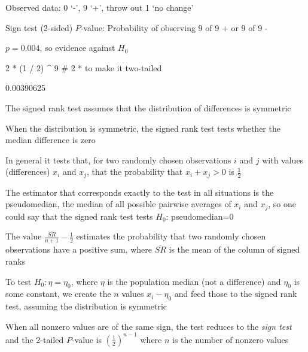  \item Observed data: 0 `-', 9 `+', throw out 1 `no change' 
 \item Sign test (2-sided) $P$-value: Probability of observing 9 of 9
   + or 9 of 9 -
 \item $p = 0.004$, so evidence against $H_0$
 \ei
\ei
\begin{Schunk}
\begin{Sinput}
2 * (1 / 2) ^ 9    # 2 * to make it two-tailed
\end{Sinput}
\begin{Soutput}
[1] 0.00390625
\end{Soutput}
\end{Schunk}

\bi
\item The signed rank test assumes that the distribution of differences is
  symmetric
\item When the distribution is symmetric, the signed rank test tests whether the
  median difference is zero
\item In general it tests that, for two randomly chosen observations
  $i$ and $j$ with values (differences) $x_i$ and $x_j$, that the
  probability that $x_{i}+x_{j} > 0$ is $\frac{1}{2}$
\item The estimator that corresponds exactly to the test in all
  situations is the pseudomedian, the median of all possible pairwise
  averages of $x_i$ and $x_j$, so one could say that the signed rank
  test tests $H_{0}$: pseudomedian=0
\item The value $\frac{\overline{SR}}{n+1}-\frac{1}{2}$ estimates the
  probability that two randomly chosen observations have a positive
  sum, where $\overline{SR}$ is the mean of the column of signed ranks
\item To test $H_{0}:\eta=\eta_{0}$, where $\eta$ is the population median
  (not a difference) and $\eta_{0}$ is some constant, we create the $n$ values
  $x_{i} - \eta_{0}$ and feed those to the signed rank test, assuming
  the distribution is symmetric
\item When all nonzero values are of the same sign, the test reduces
  to the \emph{sign test} and the 2-tailed $P$-value is
  $(\frac{1}{2})^{n-1}$ where $n$ is the number of nonzero values
\ei

